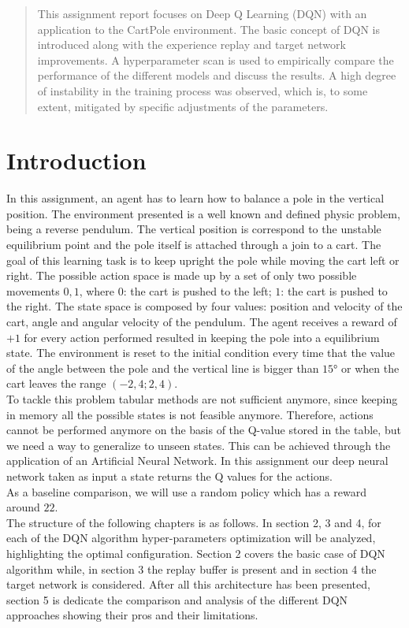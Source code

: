\documentclass{article}
\begin{document}
\begin{abstract}
This assignment report focuses on Deep Q Learning (DQN)
with an application to the CartPole environment. 
The basic concept of DQN is introduced along with the experience replay 
and target network improvements.
A hyperparameter scan is used to empirically compare the performance of
the different models and discuss the results.    
A high degree of instability in the training process was observed, 
which is, to some extent, mitigated by specific adjustments of the parameters.
\end{abstract}

\section{Introduction}
\label{sec_introduction}
In this assignment, an agent has to learn how to balance a pole in the vertical position. The environment \cite{1606.01540} presented is a well known and defined physic problem, being a reverse pendulum. The vertical position is correspond to the unstable equilibrium point and the pole itself is attached through a join to a 
cart. The goal of this learning task is to keep upright the pole while moving the cart left or right.
The possible action space is made up by a set of only two possible movements ${0,1}$, where $0$: the cart is pushed to the left; $1$: the cart is pushed to the right. The state space is composed by four values: position and velocity of the cart, angle and angular velocity of the pendulum.
The agent receives a reward of $+1$ for every action performed resulted in keeping the pole into a equilibrium state. The environment is reset to the initial condition every time that the value of the angle between the pole and the vertical line is bigger than $15°$ or when the cart leaves the range $(-2,4;2,4)$.\\
To tackle this problem tabular methods are not sufficient anymore, since keeping in memory all the possible states is not feasible anymore. Therefore, actions cannot be performed anymore on the basis of the Q-value stored in the table, but we need a way to generalize to unseen states. This can be achieved through the application of an Artificial Neural Network. In this assignment our deep neural network taken as input a state returns the Q values for the actions.\\
As a baseline comparison, we will use a random policy which has a reward around $22$.\\ 
The structure of the following chapters is as follows. In section 2, 3 and 4, for each of the DQN algorithm hyper-parameters optimization will be analyzed, highlighting the optimal configuration. Section 2 covers the basic case of DQN algorithm while, in section 3 the replay buffer is present and in section 4 the target network is considered. After all this architecture has been presented, section 5 is dedicate the comparison and analysis of the different DQN approaches showing their pros and their limitations.
\end{document}
